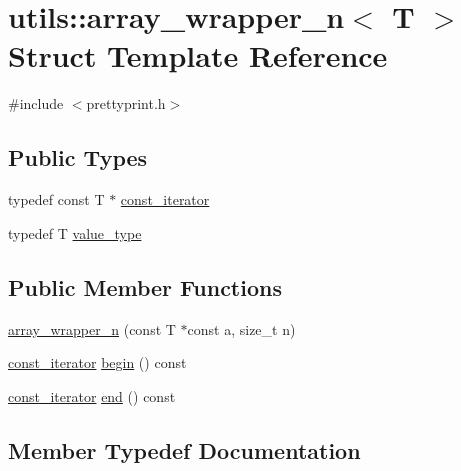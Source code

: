 \hypertarget{structutils_1_1array__wrapper__n}{}\section{utils\+::array\+\_\+wrapper\+\_\+n$<$ T $>$ Struct Template Reference}
\label{structutils_1_1array__wrapper__n}


{\ttfamily \#include $<$prettyprint.\+h$>$}

\subsection*{Public Types}
\begin{DoxyCompactItemize}
\item 
typedef const T $\ast$ \mbox{\hyperlink{structutils_1_1array__wrapper__n_adb47a0f037e288f0ba32d90176849e3d}{const\+\_\+iterator}}
\item 
typedef T \mbox{\hyperlink{structutils_1_1array__wrapper__n_ae658b4079e73a8bb06a0e63b50e36958}{value\+\_\+type}}
\end{DoxyCompactItemize}
\subsection*{Public Member Functions}
\begin{DoxyCompactItemize}
\item 
\mbox{\hyperlink{structutils_1_1array__wrapper__n_ac000dd4d2f22c1963079cefc68cf2c68}{array\+\_\+wrapper\+\_\+n}} (const T $\ast$const a, size\+\_\+t n)
\item 
\mbox{\hyperlink{structutils_1_1array__wrapper__n_adb47a0f037e288f0ba32d90176849e3d}{const\+\_\+iterator}} \mbox{\hyperlink{structutils_1_1array__wrapper__n_a18ea8eb8f61eb3556756456002ca9319}{begin}} () const
\item 
\mbox{\hyperlink{structutils_1_1array__wrapper__n_adb47a0f037e288f0ba32d90176849e3d}{const\+\_\+iterator}} \mbox{\hyperlink{structutils_1_1array__wrapper__n_a6f5d8776a0a44be465b8737983199edd}{end}} () const
\end{DoxyCompactItemize}


\subsection{Member Typedef Documentation}
\mbox{\label{structutils_1_1array__wrapper__n_adb47a0f037e288f0ba32d90176849e3d}} 
